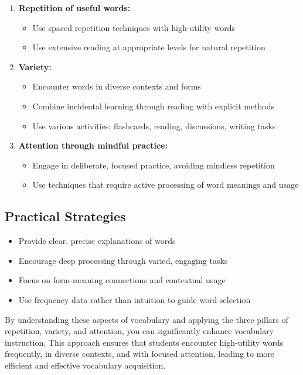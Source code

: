 \begin{enumerate}
\item \textbf{Repetition of useful words:}
    \begin{itemize}
    \item Use spaced repetition techniques with high-utility words
    \item Use extensive reading at appropriate levels for natural repetition
    \end{itemize}

\item \textbf{Variety:}
    \begin{itemize}
    \item Encounter words in diverse contexts and forms
    \item Combine incidental learning through reading with explicit methods
    \item Use various activities: flashcards, reading, discussions, writing tasks
    \end{itemize}

\item \textbf{Attention through mindful practice:}
    \begin{itemize}
    \item Engage in deliberate, focused practice, avoiding mindless repetition
    \item Use techniques that require active processing of word meanings and usage
    \end{itemize}
\end{enumerate}

\subsection*{Practical Strategies}

\begin{itemize}
\item Provide clear, precise explanations of words
\item Encourage deep processing through varied, engaging tasks
\item Focus on form-meaning connections and contextual usage
\item Use frequency data rather than intuition to guide word selection
\end{itemize}

By understanding these aspects of vocabulary and applying the three pillars of repetition, variety, and attention, you can significantly enhance vocabulary instruction. This approach ensures that students encounter high-utility words frequently, in diverse contexts, and with focused attention, leading to more efficient and effective vocabulary acquisition.